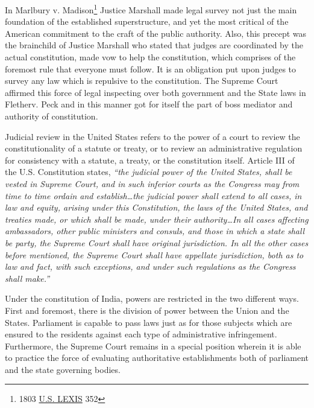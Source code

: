 \begin{multicols}{2}
\vspace{-.1cm}

\noi
In Marlbury v. Madison\footnote{1803 \underline{U.S. LEXIS} 352 } Justice Marshall made legal survey not just the main foundation of the established superstructure, and yet the most critical of the American commitment to the
craft of the public authority. Also, this precept was the brainchild of Justice Marshall who
stated that judges are coordinated by the actual constitution, made vow to help the
constitution, which comprises of the foremost rule that everyone must follow. It is an
obligation put upon judges to survey any law which is repulsive to the constitution. The
Supreme Court affirmed this force of legal inspecting over both government and the State
laws in Fletherv. Peck and in this manner got for itself the part of boss mediator and authority
of constitution.

\vspace{-.15cm}

\noi
Judicial review in the United States refers to the power of a court to review the
constitutionality of a statute or treaty, or to review an administrative regulation for
consistency with a statute, a treaty, or the constitution itself. Article III of the U.S.
Constitution states, \textit{“the judicial power of the United States, shall be vested in Supreme
Court, and in such inferior courts as the Congress may from time to time ordain and
establish…the judicial power shall extend to all cases, in law and equity, arising under this
Constitution, the laws of the United States, and treaties made, or which shall be made, under
their authority…In all cases affecting ambassadors, other public ministers and consuls, and
those in which a state shall be party, the Supreme Court shall have original jurisdiction. In
all the other cases before mentioned, the Supreme Court shall have appellate jurisdiction,
both as to law and fact, with such exceptions, and under such regulations as the Congress
shall make.”}

\vspace{-.15cm}


\vspace{-.15cm}

\noi
Under the constitution of India, powers are restricted in the two different ways. First and
foremost, there is the division of power between the Union and the States. Parliament is
capable to pass laws just as for those subjects which are ensured to the residents against each
type of administrative infringement. Furthermore, the Supreme Court remains in a special
position wherein it is able to practice the force of evaluating authoritative establishments both
of parliament and the state governing bodies.


\end{multicols}
